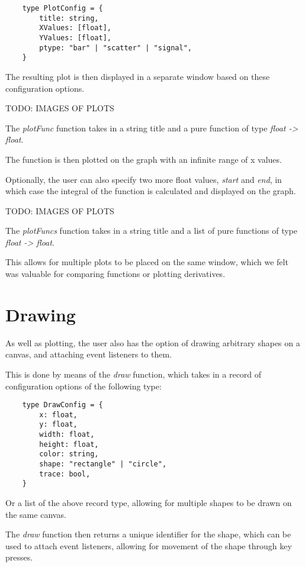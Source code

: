 \begin{verbatim}
    type PlotConfig = {
        title: string,
        XValues: [float],
        YValues: [float],
        ptype: "bar" | "scatter" | "signal",
    }
\end{verbatim}

The resulting plot is then displayed in a separate window based on these configuration options.

TODO: IMAGES OF PLOTS

The \textit{plotFunc} function takes in a string title and a pure function of type \textit{float -> float}.

The function is then plotted on the graph with an infinite range of x values.

Optionally, the user can also specify two more float values, \textit{start} and \textit{end}, in which case the 
integral of the function is calculated and displayed on the graph.

TODO: IMAGES OF PLOTS

The \textit{plotFuncs} function takes in a string title and a list of pure functions of type \textit{float -> float}.

This allows for multiple plots to be placed on the same window, which we felt was valuable for comparing functions 
or plotting derivatives.

\section{Drawing}\label{sec:drawing}

As well as plotting, the user also has the option of drawing arbitrary shapes on a canvas, and attaching event 
listeners to them.

This is done by means of the \textit{draw} function, which takes in a record of configuration options of the following
type:

\begin{verbatim}
    type DrawConfig = {
        x: float,
        y: float,
        width: float,
        height: float,
        color: string,
        shape: "rectangle" | "circle",
        trace: bool, 
    }
\end{verbatim}

Or a list of the above record type, allowing for multiple shapes to be drawn on the same canvas.

The \textit{draw} function then returns a unique identifier for the shape, which can be used to attach event 
listeners, allowing for movement of the shape through key presses.

